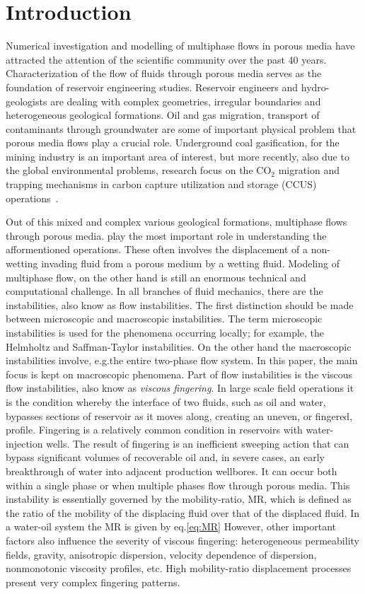 \documentclass[preprint,authoryear,12pt]{elsarticle}
\begin{document}
\section{Introduction}\label{section:Intro}
\medskip
Numerical investigation and modelling of multiphase flows in porous media have attracted the attention of the scientific community over the past 40 years. Characterization of the flow of fluids through porous media serves as the foundation of reservoir engineering studies. Reservoir engineers and hydro-geologists are dealing with complex geometries, irregular boundaries and heterogeneous geological formations. Oil and gas migration, transport of contaminants through groundwater are some of important physical problem that porous media flows play a crucial role. Underground coal gasification, for the mining industry is an important area of interest, but more recently, also due to the global environmental problems, research focus on the CO$_{\text{2}}$ migration and trapping mechanisms in carbon capture utilization and storage (CCUS) operations~\citep{spycher_2003, chen_2006, self_2012, pruess_1990c, white_1981,jiang_2011}.

\medskip
Out of this mixed and complex various geological formations, multiphase flows through porous media. play the most important role in understanding the afformentioned operations. These often involves the displacement of a non-wetting invading fluid from a porous medium by a wetting fluid. Modeling of multiphase flow, on the other hand is still an enormous technical and computational challenge. In all branches of fluid mechanics, there are the instabilities, also know as flow instabilities. The first distinction should be made between microscopic and macroscopic instabilities. The term microscopic instabilities is used for the phenomena occurring locally; for example, the Helmholtz and Saffman-Taylor instabilities. On the other hand the macroscopic instabilities involve, e.g.the entire two-phase flow system. In this paper, the main focus is kept on macroscopic phenomena. Part of flow instabilities is the viscous flow instabilities, also know as \textit{viscous fingering}. In large scale field operations it is the condition whereby the interface of two fluids, such as oil and water, bypasses sections of reservoir as it moves along, creating an uneven, or fingered, profile. Fingering is a relatively common condition in reservoirs with water-injection wells. The result of fingering is an inefficient sweeping action that can bypass significant volumes of recoverable oil and, in severe cases, an early breakthrough of water into adjacent production wellbores. It can occur both within a single phase or when multiple phases flow through porous media. This instability is essentially governed by the mobility-ratio, MR, which is defined as the ratio of the mobility of the displacing fluid over that of the displaced fluid. In a water-oil system the MR is given by eq.\ref{eq:MR}    However, other important factors also influence the severity of viscous fingering: heterogeneous permeability fields, gravity, anisotropic dispersion, velocity dependence of dispersion, nonmonotonic viscosity profiles, etc. High mobility-ratio displacement processes present very  complex  fingering  patterns.  
\end{document}
